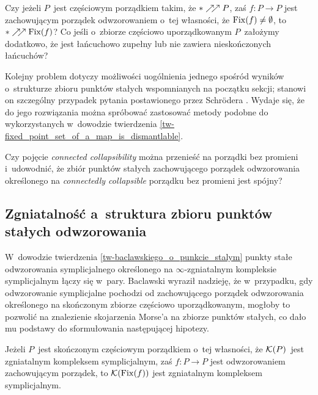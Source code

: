 \begin{problem}\label{prob10}
Czy jeżeli $P$~jest częściowym porządkiem takim, że $*\nearrow\!\!\nearrow P$, zaś $f\colon P\to P$ jest zachowującym porządek odwzorowaniem o~tej własności, że $\operatorname{Fix}(f)\not=\emptyset$, to $*\nearrow\!\!\nearrow \operatorname{Fix}(f)$? Co jeśli o~zbiorze częściowo uporządkowanym $P$~założymy dodatkowo, że jest łańcuchowo zupełny lub nie zawiera nieskończonych łańcuchów?
\end{problem}

Kolejny problem dotyczy możliwości uogólnienia jednego spośród wyników o~strukturze zbioru punktów stałych wspomnianych na początku sekcji; stanowi on szczególny przypadek pytania postawionego przez Schr{\"o}dera \cite[Open Question 4]{Schroder99}. Wydaje się, że do jego rozwiązania można spróbować zastosować metody podobne do wykorzystanych w~dowodzie twierdzenia \ref{tw-fixed_point_set_of_a_map_is_dismantlable}.

\begin{problem}\label{problem-connected_collapsibility}
Czy pojęcie \textit{connected collapsibility} można przenieść na porządki bez promieni i~udowodnić, że zbiór punktów stałych zachowującego porządek odwzorowania określonego na \textit{connectedly collapsible} porządku bez promieni jest spójny?
\end{problem}







\subsection{Zgniatalność a~struktura zbioru punktów stałych odwzorowania}
W~dowodzie twierdzenia \ref{tw-baclawskiego_o_punkcie_stalym} punkty stałe odwzorowania symplicjalnego określonego na $\infty$-zgniatalnym kompleksie symplicjalnym łączy się w~pary. Baclawski \cite[Section 9]{Baclawski12} wyraził nadzieję, że w~przypadku, gdy odwzorowanie symplicjalne pochodzi od zachowującego porządek odwzorowania określonego na skończonym zbiorze częściowo uporządkowanym, mogłoby to pozwolić na znalezienie skojarzenia Morse'a na zbiorze punktów stałych, co dało mu podstawy do sformułowania następującej hipotezy.

\begin{hipoteza}\label{hipoteza-bacl} Jeżeli $P$~jest skończonym częściowym porządkiem o~tej własności, że $\mathcal{K}(P)$~jest zgniatalnym kompleksem symplicjalnym, zaś $f\colon P\to P$ jest odwzorowaniem zachowującym porządek, to $\mathcal{K}(\operatorname{Fix}(f))$ jest zgniatalnym kompleksem symplicjalnym.
\end{hipoteza}

